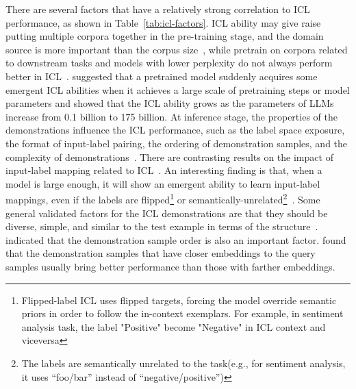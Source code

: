 There are several factors that have a relatively strong correlation to ICL performance, as shown in Table~\ref{tab:icl-factors}.
ICL ability may give raise putting multiple corpora together in the pre-training stage, and the domain source is more important than the corpus size~\cite{shin2022effect}, while pretrain on corpora related to downstream tasks and models with lower perplexity do not always perform better in ICL~\cite{shin2022effect}.
\textcite{wei2022emergent} suggested that a pretrained model suddenly acquires some emergent ICL abilities when it achieves a large scale of pretraining steps or model parameters and \textcite{brown2020language} showed that the ICL ability grows as the parameters of LLMs increase from 0.1 billion to 175 billion.
At inference stage, the properties of the demonstrations influence the ICL performance, such as the label space exposure, the format of input-label pairing, the ordering of demonstration samples, and the complexity of demonstrations~\cite{min2022rethinking, an2023how, lu2022fantastically}.
There are contrasting results on the impact of input-label mapping related to ICL~\cite{min2022rethinking, yoo2022groundtruth}.
An interesting finding is that, when a model is large enough, it will show an emergent ability to learn input-label mappings, even if the labels are flipped\footnote{Flipped-label ICL uses flipped targets, forcing the model override semantic priors in order to follow the in-context exemplars. For example, in sentiment analysis task, the label "Positive" become "Negative" in ICL context and viceversa} or semantically-unrelated\footnote{The labels are semantically unrelated to the task(e.g., for sentiment analysis, it uses “foo/bar” instead of “negative/positive”)}~\cite{wei2023larger}.
Some general validated factors for the ICL demonstrations are that they should be diverse, simple, and similar to the test example in terms of the structure~\cite{an2023how}.
\textcite{lu2022fantastically} indicated that the demonstration sample order is also an important factor.
\textcite{liu2022good} found that the demonstration samples that have closer embeddings to the query samples usually bring better performance than those with farther embeddings.

